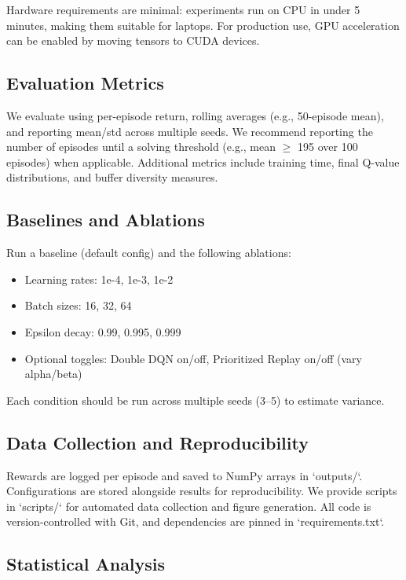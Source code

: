 \documentclass{IEEEtran}
\begin{document}
Hardware requirements are minimal: experiments run on CPU in under 5 minutes, making them suitable for laptops. For production use, GPU acceleration can be enabled by moving tensors to CUDA devices.

\subsection{Evaluation Metrics}

We evaluate using per-episode return, rolling averages (e.g., 50-episode mean), and reporting mean/std across multiple seeds. We recommend reporting the number of episodes until a solving threshold (e.g., mean $\geq$ 195 over 100 episodes) when applicable. Additional metrics include training time, final Q-value distributions, and buffer diversity measures.

\subsection{Baselines and Ablations}

Run a baseline (default config) and the following ablations:
\begin{itemize}
\item Learning rates: 1e-4, 1e-3, 1e-2
\item Batch sizes: 16, 32, 64
\item Epsilon decay: 0.99, 0.995, 0.999
\item Optional toggles: Double DQN on/off, Prioritized Replay on/off (vary alpha/beta)
\end{itemize}

Each condition should be run across multiple seeds (3--5) to estimate variance.

\subsection{Data Collection and Reproducibility}

Rewards are logged per episode and saved to NumPy arrays in `outputs/`. Configurations are stored alongside results for reproducibility. We provide scripts in `scripts/` for automated data collection and figure generation. All code is version-controlled with Git, and dependencies are pinned in `requirements.txt`.

\subsection{Statistical Analysis}
\end{document}
